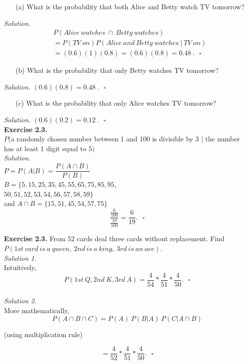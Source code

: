 \documentclass[12pt]{book}
\begin{document}
\begin{itemize} \item [(a)] What is the probability that both Alice and Betty watch TV tomorrow? \end{itemize}
\textit{Solution. }
\begin{align*}
&P(Alice~watches~\cap~Betty~watches)\\
&=P(TV~on)P(Alice~and~Betty~watches~|~TV~on)\\
&=(0.6)(1)(0.8)=(0.6)(0.8)=0.48~.~~~\square
\end{align*}

\begin{itemize} \item [(b)] What is the probability that only Betty watches TV tomorrow? \end{itemize}
\textit{Solution. }
$(0.6)(0.8)=0.48~.~~~\square$

\begin{itemize} \item [(c)] What is the probability that only Alice watches TV tomorrow? \end{itemize}
\textit{Solution. }
$(0.6)(0.2)=0.12~.~~~\square$\\

\noindent \textbf{Exercise 2.3. } \\
$P($a randomly chosen number between 1 and 100 is divisible by 3 $|$ the number has at least 1 digit equal to 5$)$\\
\textit{Solution. }\\
$P=P(A|B)=\dfrac{P(A\cap B)}{P(B)}$\\
$B=\{5,15,25,35,45,55,65,75,85,95,$\\
$50,51,52,53,54,56,57,58,59\}$\\

\noindent and $A\cap B = \{15,51,45,54,57,75\}$
$$\dfrac{\frac{6}{100}}{\frac{19}{100}}=\dfrac{6}{19}.~~~\square$$

\newpage
\noindent \textbf{Exercise 2.3. } From 52 cards deal three cards without replacement. Find $P(1st~card~is~a~queen,~2nd~is~a~king,~3rd~is~an~ace)$.\\

\noindent \textit{Solution 1. } \\
Intuitively, 
$$P(1st~Q,2nd~K,3rd~A)=\dfrac{4}{54} * \dfrac{4}{51} * \dfrac{4}{50}.~~~\square$$\\

\noindent \textit{Solution 2. } \\
More mathematically,\\
$$P(A\cap B \cap C) = P(A)~P(B|A)~P(C|A\cap B)$$ \begin{center}(using multiplication rule)\end{center}
$$=\dfrac{4}{52} * \dfrac{4}{51} * \dfrac{4}{50}.~~~\square$$
\end{document}
